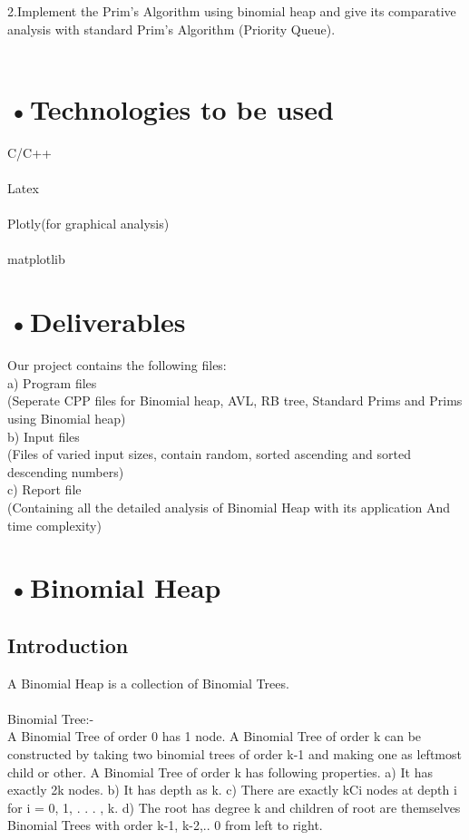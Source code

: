 \documentclass[10pt,a4paper]{article} ,
\begin{document}
	2.Implement the Prim’s Algorithm using binomial heap and give its comparative analysis with standard Prim’s Algorithm (Priority Queue).\\ \\ 
	
\section*{•Technologies to be used}

	C/C++\\
	\\Latex\\
	\\Plotly(for graphical analysis)\\
	\\matplotlib


\section*{•Deliverables}

Our project contains the following files:\\
a) Program files\\
	(Seperate CPP files for Binomial heap, AVL, RB tree, Standard Prims and Prims using Binomial heap)\\

b) Input files \\
	(Files of varied input sizes, contain random, sorted ascending and sorted descending  numbers)\\
	
c) Report file \\
	(Containing all the detailed analysis of Binomial Heap with its application And time complexity)

	

\section*{•Binomial Heap} 

\subsection*{Introduction}
	A Binomial Heap is a collection of Binomial Trees.\\ \\
Binomial Tree:- \\
A Binomial Tree of order 0 has 1 node. A Binomial Tree of order k can be constructed by taking two binomial trees of order k-1 and making one as leftmost child or other.
A Binomial Tree of order k has following properties.
a) It has exactly 2k nodes.
b) It has depth as k.
c) There are exactly kCi nodes at depth i for i = 0, 1, . . . , k.
d) The root has degree k and children of root are themselves Binomial Trees with order k-1, k-2,.. 0 from left to right.\\ 
\end{document}

